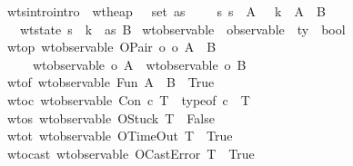 \begin{isabellebody}
\ \ wts{\isacharunderscore}intro{\isacharbrackleft}intro{\isacharbang}{\isacharbrackright}{\isacharcolon}\ {\isachardoublequoteopen}{\isasymlbrakk}\ wt{\isacharunderscore}heap\ {\isasymSigma}\ {\isasymmu}\ {\isacharparenleft}set\ as{\isacharparenright}{\isacharsemicolon}\ {\isasymGamma}{\isacharsemicolon}{\isasymSigma}\ {\isasymturnstile}\ {\isasymrho}{\isacharsemicolon}\ {\isasymGamma}\ {\isasymturnstile}\isactrlisub s\ s\ {\isacharcolon}\ A{\isacharsemicolon}\ {\isasymSigma}\ {\isasymturnstile}\ k\ {\isacharcolon}\ A\ {\isasymRightarrow}\ B\ {\isasymrbrakk}\ {\isasymLongrightarrow}\isanewline
\ \ \ \ wt{\isacharunderscore}state\ {\isacharparenleft}s{\isacharcomma}\ {\isasymrho}{\isacharcomma}\ k{\isacharcomma}\ {\isasymmu}{\isacharcomma}\ as{\isacharparenright}\ B{\isachardoublequoteclose}\isanewline
\isanewline
{}\isamarkupfalse \ wt{\isacharunderscore}observable\ {\isacharcolon}{\isacharcolon}\ {\isachardoublequoteopen}observable\ {\isasymRightarrow}\ ty\ {\isasymRightarrow}\ bool{\isachardoublequoteclose}\ \isanewline
\ \ wto{\isacharunderscore}p{\isacharcolon}\ {\isachardoublequoteopen}wt{\isacharunderscore}observable\ {\isacharparenleft}OPair\ o{\isacharprime}\ o{\isacharprime}{\isacharprime}{\isacharparenright}\ {\isacharparenleft}A\ {\isasymtimes}\ B{\isacharparenright}\ {\isacharequal}\ \isanewline
\ \ \ \ \ \ {\isacharparenleft}wt{\isacharunderscore}observable\ o{\isacharprime}\ A\ {\isasymand}\ wt{\isacharunderscore}observable\ o{\isacharprime}{\isacharprime}\ B{\isacharparenright}{\isachardoublequoteclose}\ {\isacharbar}\isanewline
\ \ wto{\isacharunderscore}f{\isacharcolon}\ {\isachardoublequoteopen}wt{\isacharunderscore}observable\ Fun\ {\isacharparenleft}A\ {\isasymrightarrow}\ B{\isacharparenright}\ {\isacharequal}\ True{\isachardoublequoteclose}\ {\isacharbar}\isanewline
\ \ wto{\isacharunderscore}c{\isacharcolon}\ {\isachardoublequoteopen}wt{\isacharunderscore}observable\ {\isacharparenleft}Con\ c{\isacharparenright}\ T\ {\isacharequal}\ {\isacharparenleft}typeof\ c\ {\isacharequal}\ T{\isacharparenright}{\isachardoublequoteclose}\ {\isacharbar}\isanewline
\ \ wto{\isacharunderscore}s{\isacharcolon}\ {\isachardoublequoteopen}wt{\isacharunderscore}observable\ OStuck\ T\ {\isacharequal}\ False{\isachardoublequoteclose}\ {\isacharbar}\isanewline
\ \ wto{\isacharunderscore}t{\isacharcolon}\ {\isachardoublequoteopen}wt{\isacharunderscore}observable\ OTimeOut\ T\ {\isacharequal}\ True{\isachardoublequoteclose}\ {\isacharbar}\isanewline
\ \ wto{\isacharunderscore}cast{\isacharcolon}\ {\isachardoublequoteopen}wt{\isacharunderscore}observable\ OCastError\ T\ {\isacharequal}\ True{\isachardoublequoteclose}\ {\isacharbar}\isanewline

\end{isabellebody}
